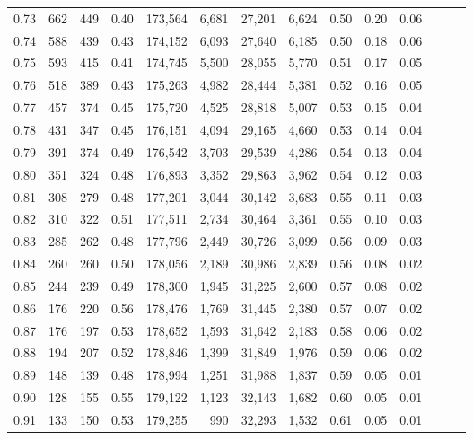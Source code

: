 \begin{tabular}{rrrrrrrrrrrrrr}
0.73 &    662 &  449 &  0.40 &  173,564 &    6,681 &  27,201 &   6,624 &  0.50 &  0.20 &      0.06 \\
0.74 &    588 &  439 &  0.43 &  174,152 &    6,093 &  27,640 &   6,185 &  0.50 &  0.18 &      0.06 \\
0.75 &    593 &  415 &  0.41 &  174,745 &    5,500 &  28,055 &   5,770 &  0.51 &  0.17 &      0.05 \\
0.76 &    518 &  389 &  0.43 &  175,263 &    4,982 &  28,444 &   5,381 &  0.52 &  0.16 &      0.05 \\
0.77 &    457 &  374 &  0.45 &  175,720 &    4,525 &  28,818 &   5,007 &  0.53 &  0.15 &      0.04 \\
0.78 &    431 &  347 &  0.45 &  176,151 &    4,094 &  29,165 &   4,660 &  0.53 &  0.14 &      0.04 \\
0.79 &    391 &  374 &  0.49 &  176,542 &    3,703 &  29,539 &   4,286 &  0.54 &  0.13 &      0.04 \\
0.80 &    351 &  324 &  0.48 &  176,893 &    3,352 &  29,863 &   3,962 &  0.54 &  0.12 &      0.03 \\
0.81 &    308 &  279 &  0.48 &  177,201 &    3,044 &  30,142 &   3,683 &  0.55 &  0.11 &      0.03 \\
0.82 &    310 &  322 &  0.51 &  177,511 &    2,734 &  30,464 &   3,361 &  0.55 &  0.10 &      0.03 \\
0.83 &    285 &  262 &  0.48 &  177,796 &    2,449 &  30,726 &   3,099 &  0.56 &  0.09 &      0.03 \\
0.84 &    260 &  260 &  0.50 &  178,056 &    2,189 &  30,986 &   2,839 &  0.56 &  0.08 &      0.02 \\
0.85 &    244 &  239 &  0.49 &  178,300 &    1,945 &  31,225 &   2,600 &  0.57 &  0.08 &      0.02 \\
0.86 &    176 &  220 &  0.56 &  178,476 &    1,769 &  31,445 &   2,380 &  0.57 &  0.07 &      0.02 \\
0.87 &    176 &  197 &  0.53 &  178,652 &    1,593 &  31,642 &   2,183 &  0.58 &  0.06 &      0.02 \\
0.88 &    194 &  207 &  0.52 &  178,846 &    1,399 &  31,849 &   1,976 &  0.59 &  0.06 &      0.02 \\
0.89 &    148 &  139 &  0.48 &  178,994 &    1,251 &  31,988 &   1,837 &  0.59 &  0.05 &      0.01 \\
0.90 &    128 &  155 &  0.55 &  179,122 &    1,123 &  32,143 &   1,682 &  0.60 &  0.05 &      0.01 \\
0.91 &    133 &  150 &  0.53 &  179,255 &      990 &  32,293 &   1,532 &  0.61 &  0.05 &      0.01 \\

\end{tabular}
